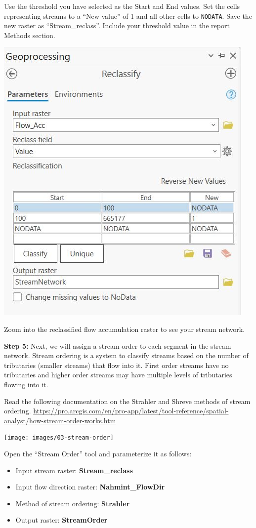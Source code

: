 \documentclass[
]{book}
\providecommand{\tightlist}{%
  \setlength{\itemsep}{0pt}\setlength{\parskip}{0pt}}
\begin{document}
Use the threshold you have selected as the Start and End values. Set the cells representing streams to a ``New value'' of 1 and all other cells to \texttt{NODATA}. Save the new raster as ``Stream\_reclass''. Include your threshold value in the report Methods section.

\includegraphics[width=0.75\linewidth]{images/03-reclassify}

Zoom into the reclassified flow accumulation raster to see your stream network.

\textbf{Step 5:} Next, we will assign a stream order to each segment in the stream network. Stream ordering is a system to classify streams based on the number of tributaries (smaller streams) that flow into it. First order streams have no tributaries and higher order streams may have multiple levels of tributaries flowing into it.

Read the following documentation on the Strahler and Shreve methods of stream ordering. \url{https://pro.arcgis.com/en/pro-app/latest/tool-reference/spatial-analyst/how-stream-order-works.htm}

\texttt{[image: images/03-stream-order]}

Open the ``Stream Order'' tool and parameterize it as follows:

\begin{itemize}
\tightlist
\item
  Input stream raster: \textbf{Stream\_reclass}
\item
  Input flow direction raster: \textbf{Nahmint\_FlowDir}
\item
  Method of stream ordering: \textbf{Strahler}
\item
  Output raster: \textbf{StreamOrder}
\end{itemize}
\end{document}
